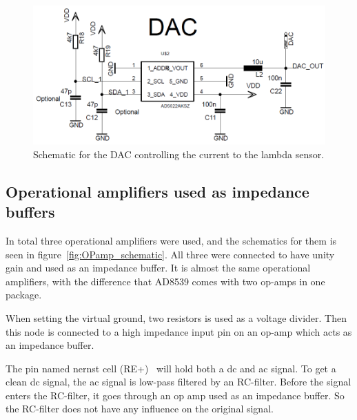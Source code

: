 \begin{figure}
    \centering
    \includegraphics[width=.9\textwidth]{Chapter3/Figures/DAC_schematic.png}
    \caption{Schematic for the DAC controlling the current to the lambda sensor.}
    \label{fig:DAC_schematic}
\end{figure}


\subsection{Operational amplifiers used as impedance buffers}

In total three operational amplifiers were used, and the schematics for them is seen in figure~\ref{fig:OPamp_schematic}. All three were connected to have unity gain and used as an impedance buffer. It is almost the same operational amplifiers, with the difference that AD8539 comes with two op-amps in one package.


When setting the virtual ground, two resistors is used as a voltage divider. Then this node is connected to a high impedance input pin on an op-amp which acts as an impedance buffer.


The pin named nernst cell (RE+)~\cite{LSU49} will hold both a \ac{dc} and \ac{ac} signal. To get a clean \ac{dc} signal, the \ac{ac} signal is low-pass filtered by an RC-filter. Before the signal enters the RC-filter, it goes through an op amp used as an impedance buffer. So the RC-filter does not have any influence on the original signal.


